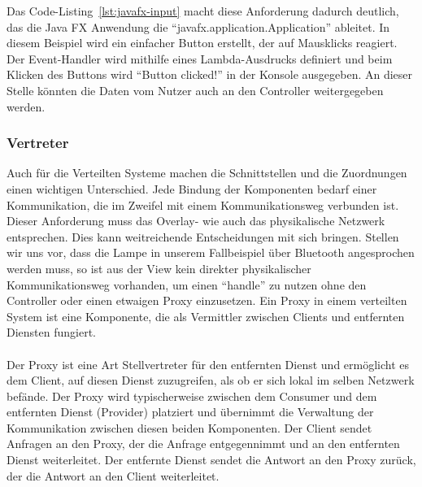 Das Code-Listing~\ref{lst:javafx-input} macht diese Anforderung dadurch deutlich, das die Java FX Anwendung die \enquote{javafx.application.Application} ableitet. In diesem Beispiel wird ein einfacher Button erstellt, der auf Mausklicks reagiert. Der Event-Handler wird mithilfe eines Lambda-Ausdrucks definiert und beim Klicken des Buttons wird \enquote{Button clicked!} in der Konsole ausgegeben. An dieser Stelle könnten die Daten vom Nutzer auch an den Controller weitergegeben werden.

\subsubsection{Vertreter}
Auch für die Verteilten Systeme machen die Schnittstellen und die Zuordnungen einen wichtigen Unterschied. Jede Bindung der Komponenten bedarf einer Kommunikation, die im Zweifel mit einem Kommunikationsweg  verbunden ist. Dieser Anforderung muss das Overlay- wie auch das physikalische Netzwerk entsprechen. Dies kann weitreichende Entscheidungen mit sich bringen. Stellen wir uns vor, dass die Lampe in unserem Fallbeispiel über Bluetooth angesprochen werden muss, so ist aus der View kein direkter physikalischer Kommunikationsweg vorhanden, um einen \enquote{handle} zu nutzen ohne den Controller oder einen etwaigen Proxy einzusetzen.  Ein Proxy in einem verteilten System ist eine Komponente, die als Vermittler zwischen Clients und entfernten Diensten fungiert. 
\\\\
Der Proxy ist eine Art Stellvertreter für den entfernten Dienst und ermöglicht es dem Client, auf diesen Dienst zuzugreifen, als ob er sich lokal im selben Netzwerk befände.
Der Proxy wird typischerweise zwischen dem Consumer und dem entfernten Dienst (Provider) platziert und übernimmt die Verwaltung der Kommunikation zwischen diesen beiden Komponenten. Der Client sendet Anfragen an den Proxy, der die Anfrage entgegennimmt und an den entfernten Dienst weiterleitet. Der entfernte Dienst sendet die Antwort an den Proxy zurück, der die Antwort an den Client weiterleitet.\\\\

